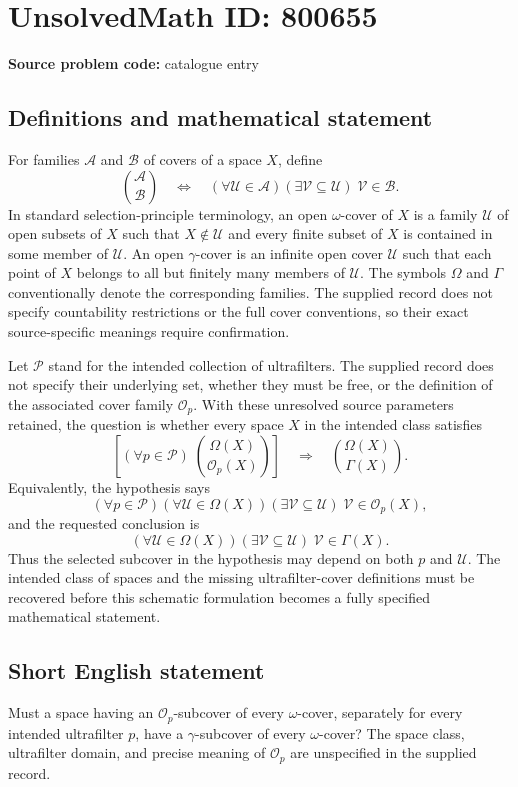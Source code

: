 \documentclass[11pt]{article}
\begin{document}
\section*{UnsolvedMath ID: 800655}
\textbf{Source problem code:} catalogue entry
\subsection{Definitions and mathematical statement}
For families \(\mathcal A\) and \(\mathcal B\) of covers of a space \(X\), define
\[
\binom{\mathcal A}{\mathcal B}
\quad\Longleftrightarrow\quad
(\forall\mathcal U\in\mathcal A)(\exists\mathcal V\subseteq\mathcal U)\;\mathcal V\in\mathcal B.
\]
In standard selection-principle terminology, an open \(\omega\)-cover of \(X\) is a family \(\mathcal U\) of open subsets of \(X\) such that \(X\notin\mathcal U\) and every finite subset of \(X\) is contained in some member of \(\mathcal U\). An open \(\gamma\)-cover is an infinite open cover \(\mathcal U\) such that each point of \(X\) belongs to all but finitely many members of \(\mathcal U\). The symbols \(\Omega\) and \(\Gamma\) conventionally denote the corresponding families. The supplied record does not specify countability restrictions or the full cover conventions, so their exact source-specific meanings require confirmation.

Let \(\mathscr P\) stand for the intended collection of ultrafilters. The supplied record does not specify their underlying set, whether they must be free, or the definition of the associated cover family \(\mathcal O_p\). With these unresolved source parameters retained, the question is whether every space \(X\) in the intended class satisfies
\[
\left[(\forall p\in\mathscr P)\;\binom{\Omega(X)}{\mathcal O_p(X)}\right]
\quad\Longrightarrow\quad
\binom{\Omega(X)}{\Gamma(X)}.
\]
Equivalently, the hypothesis says
\[
(\forall p\in\mathscr P)(\forall\mathcal U\in\Omega(X))
(\exists\mathcal V\subseteq\mathcal U)\;\mathcal V\in\mathcal O_p(X),
\]
and the requested conclusion is
\[
(\forall\mathcal U\in\Omega(X))
(\exists\mathcal V\subseteq\mathcal U)\;\mathcal V\in\Gamma(X).
\]
Thus the selected subcover in the hypothesis may depend on both \(p\) and \(\mathcal U\). The intended class of spaces and the missing ultrafilter-cover definitions must be recovered before this schematic formulation becomes a fully specified mathematical statement.
\subsection{Short English statement}
Must a space having an \(\mathcal O_p\)-subcover of every \(\omega\)-cover, separately for every intended ultrafilter \(p\), have a \(\gamma\)-subcover of every \(\omega\)-cover? The space class, ultrafilter domain, and precise meaning of \(\mathcal O_p\) are unspecified in the supplied record.
\end{document}
